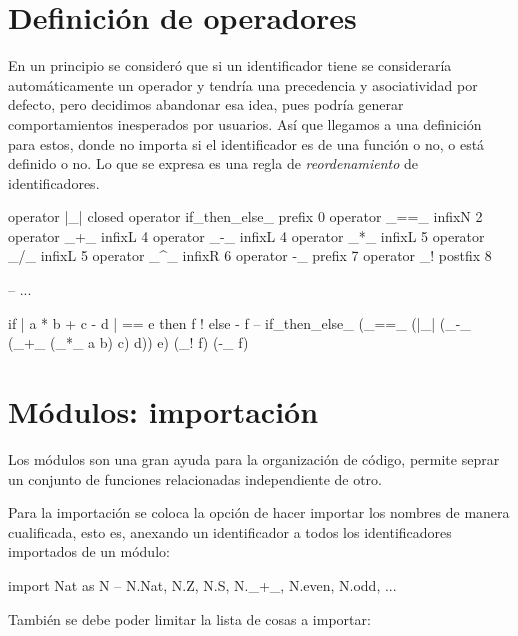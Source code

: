 {\section{Definición de operadores}

\begin{designfr}
En un principio se consideró que si un identificador tiene \inlinecode{\_} se consideraría automáticamente un operador y tendría una precedencia y asociatividad por defecto, pero decidimos abandonar esa idea, pues podría generar comportamientos inesperados por usuarios. Así que llegamos a una definición para estos, donde no importa si el identificador es de una función o no, o está definido o no. Lo que se expresa es una regla de \emph{reordenamiento} de identificadores.

\begin{anglercode}[label=lst:operatorsdefinition]
operator |_|                closed
operator if_then_else_      prefix  0
operator _==_               infixN  2
operator _+_                infixL  4
operator _-_                infixL  4
operator _*_                infixL  5
operator _/_                infixL  5
operator _^_                infixR  6
operator -_                 prefix  7
operator _!                 postfix 8

-- ...

if | a * b + c - d | == e then f ! else - f
-- if_then_else_ (_==_ (|_| (_-_ (_+_ (_*_ a b) c) d)) e) (_! f) (-_ f)
\end{anglercode}
\end{designfr}

\section{Módulos: importación}

\begin{designfr}
Los módulos son una gran ayuda para la organización de código, permite seprar un conjunto de funciones relacionadas independiente de otro.

Para la importación se coloca la opción de hacer importar los nombres de manera cualificada, esto es, anexando un identificador a todos los identificadores importados de un módulo:

\begin{anglercode}
import Nat as N         -- N.Nat, N.Z, N.S, N._+_, N.even, N.odd, ...
\end{anglercode}

También se debe poder limitar la lista de cosas a importar:


\end{designfr}}
